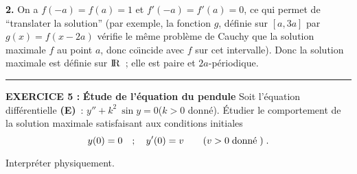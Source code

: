\documentclass{article}
\begin{document}
\msk
{\bf 2.} On a $f(-a)=f(a)=1$ et $f'(-a)=f'(a)=0$, ce qui permet de ``translater la solution'' (par exemple, la fonction $g$, d\'efinie sur $[a,3a]$ par $g(x)=f(x-2a)$ v\'erifie le m\^eme probl\`eme de Cauchy que la solution maximale $f$ au point $a$, donc co\"\i ncide avec $f$ sur cet intervalle). Donc la solution maximale est d\'efinie sur ${\rm I\kern-0.6mm R}$~; elle est paire et $2a$-p\'eriodique.

\bsk
\hrule
\bsk

{\bf EXERCICE 5 :}\msk
{\bf \'Etude de l'\'equation du pendule}\msk
Soit l'\'equation diff\'erentielle {\bf (E)}~: $y''+k^2\>\sin y=0$\qquad ($k>0$ donn\'e).\msk
\'Etudier le comportement de la solution maximale satisfaisant aux conditions initiales\vv
$$y(0)=0\quad;\quad y'(0)=v\qquad(v>0\;\hbox{donn\'e}\;)\;.$$\par
Interpr\'eter physiquement.


\msk
\cl{- - - - - - - - - - - - - - - - - - - - - - - - - - - - - - - }
\msk
\end{document}
